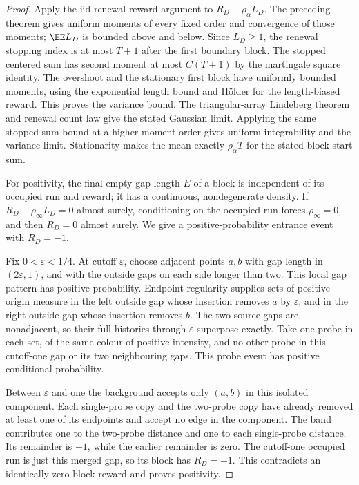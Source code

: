 \documentclass[11pt,letterpaper]{article}
\begin{document}
\begin{proof}
Apply the iid renewal-reward argument to
$R_D-\rho_\alpha L_D$. The preceding theorem gives uniform
moments of every fixed order and convergence of those moments;
$\EE L_D$ is bounded above and below. Since $L_D\ge1$,
the renewal stopping index is at most $T+1$ after the first
boundary block. The stopped centered sum has second moment
at most $C(T+1)$ by the martingale square identity.
The overshoot and the stationary first block have uniformly
bounded moments, using the exponential length bound and
H\"older for the length-biased reward. This proves the variance
bound. The triangular-array Lindeberg theorem and renewal
count law give the stated Gaussian limit. Applying the same
stopped-sum bound at a higher moment order gives uniform
integrability and the variance limit. Stationarity makes the
mean exactly $\rho_\alpha T$ for the stated block-start sum.

For positivity, the final empty-gap length $E$ of a block is
independent of its occupied run and reward; it has a continuous,
nondegenerate density. If $R_D-\rho_\infty L_D=0$ almost surely,
conditioning on the occupied run forces $\rho_\infty=0$, and
then $R_D=0$ almost surely. We give a positive-probability
entrance event with $R_D=-1$.

Fix $0<\varepsilon<1/4$. At cutoff $\varepsilon$, choose
adjacent points $a,b$ with gap length in $(2\varepsilon,1)$,
and with the outside gaps on each side longer than two.
This local gap pattern has positive probability. Endpoint
regularity supplies sets of positive origin measure in the
left outside gap whose insertion removes $a$ by $\varepsilon$,
and in the right outside gap whose insertion removes $b$.
The two source gaps are nonadjacent, so their full histories
through $\varepsilon$ superpose exactly. Take one probe in
each set, of the same colour of positive intensity, and no
other probe in this cutoff-one gap or its two neighbouring
gaps. This probe event has positive conditional probability.

Between $\varepsilon$ and one the background accepts only
$(a,b)$ in this isolated component. Each single-probe copy
and the two-probe copy have already removed at least one of
its endpoints and accept no edge in the component. The band
contributes one to the two-probe distance and one to each
single-probe distance. Its remainder is $-1$, while the earlier
remainder is zero. The cutoff-one occupied run is just this
merged gap, so its block has $R_D=-1$. This contradicts an
identically zero block reward and proves positivity.
\end{proof}
\end{document}
